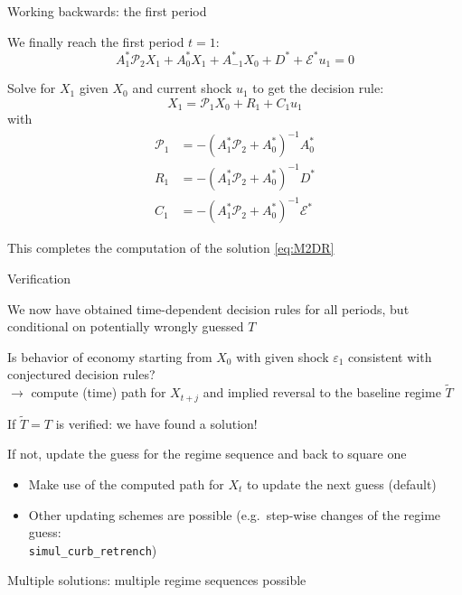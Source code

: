 \begin{frame}{Working backwards: the first period}
\begin{wideitemize}
\item We finally reach the first period $t=1$:
\begin{equation}
  A_1^{\ast}\mathcal{P}_{2}X_{1} + A_0^{\ast}X_{1}  + A_{-1}^{\ast}X_{0} + D^{\ast}+ \mathcal{E}^{\ast} u_1= 0
\end{equation}
\item Solve for $X_{1}$ given $X_{0}$ and current shock $u_1$ to get the decision rule:
\begin{equation}
	X_{1} =    \mathcal{P}_{1}X_{0}+ R_{1}+C_1 u_1
\end{equation}
with
\begin{align}
\mathcal{P}_{1} &= -\left(A_1^{\ast}\mathcal{P}_{2}+A_0^{\ast}\right)^{-1}A_{0}^{\ast}\\
R_{1} &= -\left(A_1^{\ast}\mathcal{P}_{2}+A_0^{\ast}\right)^{-1}D^{\ast}\\
C_{1} &= -\left(A_1^{\ast}\mathcal{P}_{2}+A_0^{\ast}\right)^{-1}\mathcal{E}^{\ast}
\end{align}
\item This completes the computation of the solution \eqref{eq:M2DR}
\end{wideitemize}
\end{frame}


\begin{frame}{Verification}
\begin{wideitemize}
\item We now have obtained time-dependent decision rules for all periods, but conditional on potentially wrongly guessed $T$\\
\item Is behavior of economy starting from $X_0$ with given shock $\varepsilon_1$ consistent with conjectured decision rules?\\
$\rightarrow$  compute (time) path for $X_{t+j}$ and implied reversal to the baseline regime $\tilde T$
\item If $\tilde T =T$ is verified: we have found a solution!
\item If not, update the guess for the regime sequence and back to square one
	\begin{itemize}
		\item Make use of the computed path for $X_t$ to update the next guess (default)
		\item Other updating schemes are possible (e.g.\ step-wise changes of the regime guess:\\ \texttt{simul\_curb\_retrench})
	\end{itemize}
\item Multiple solutions: multiple regime sequences possible \parencite{Holden2022}
\end{wideitemize}
\end{frame}


